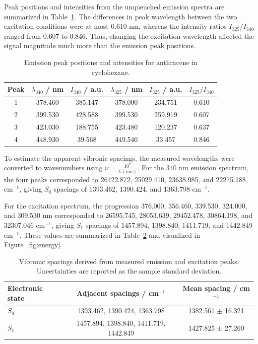 \documentclass[12pt]{article}
\begin{document}
Peak positions and intensities from the unquenched emission spectra are summarized in Table~\ref{tab:empeaks}. The differences in peak wavelength between the two excitation conditions were at most 0.610 nm, whereas the intensity ratios $I_{325}/I_{340}$ ranged from 0.607 to 0.846. Thus, changing the excitation wavelength affected the signal magnitude much more than the emission peak positions.

\begin{table}[H]
\centering
\caption{Emission peak positions and intensities for anthracene in cyclohexane.}
\label{tab:empeaks}
\begin{tabular}{cccccc}
\toprule
Peak & $\lambda_{340}$ / nm & $I_{340}$ / a.u. & $\lambda_{325}$ / nm & $I_{325}$ / a.u. & $I_{325}/I_{340}$ \\
\midrule
1 & 378.460 & 385.147 & 378.000 & 234.751 & 0.610 \\
2 & 399.530 & 428.588 & 399.530 & 259.919 & 0.607 \\
3 & 423.030 & 188.755 & 423.480 & 120.237 & 0.637 \\
4 & 448.930 & 39.568  & 449.540 & 33.457  & 0.846 \\
\bottomrule
\end{tabular}
\end{table}

To estimate the apparent vibronic spacings, the measured wavelengths were converted to wavenumbers using $\tilde{\nu} = \frac{10^7}{\lambda\, (\mathrm{nm})}$. For the 340 nm emission spectrum, the four peaks corresponded to 26422.872, 25029.410, 23638.985, and 22275.188 cm$^{-1}$, giving $S_0$ spacings of 1393.462, 1390.424, and 1363.798 cm$^{-1}$. 

For the excitation spectrum, the progression 376.000, 356.460, 339.530, 324.000, and 309.530 nm corresponded to 26595.745, 28053.639, 29452.478, 30864.198, and 32307.046 cm$^{-1}$, giving $S_1$ spacings of 1457.894, 1398.840, 1411.719, and 1442.849 cm$^{-1}$. These values are summarized in Table~\ref{tab:spacing} and visualized in Figure~\ref{fig:energy}.

\begin{table}[H]
\centering
\caption{Vibronic spacings derived from measured emission and excitation peaks. Uncertainties are reported as the sample standard deviation.}
\label{tab:spacing}
\begin{tabular}{lcc}
\toprule
Electronic state & Adjacent spacings / cm$^{-1}$ & Mean spacing / cm$^{-1}$ \\
\midrule
$S_0$ & 1393.462, 1390.424, 1363.798 & 1382.561 $\pm$ 16.321 \\
$S_1$ & 1457.894, 1398.840, 1411.719, 1442.849 & 1427.825 $\pm$ 27.260 \\
\bottomrule
\end{tabular}
\end{table}
\end{document}
